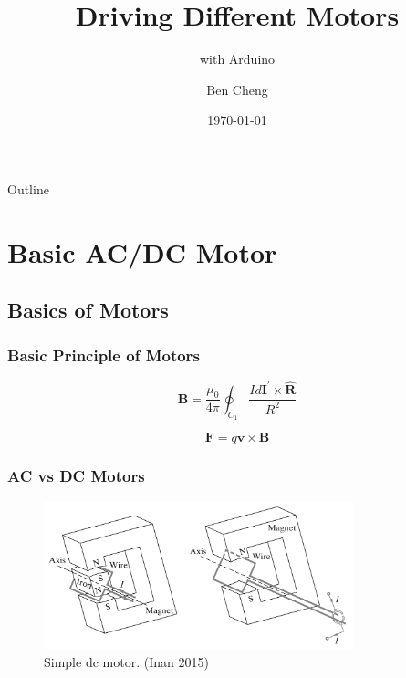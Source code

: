 \documentclass[compress, aspectratio=32]{beamer}
\title[Motors]{Driving Different Motors}
\subtitle{with Arduino}
\author{Ben Cheng}
\institute{RISD ID}
\date{\today}
\begin{document}
\frame{\titlepage}

\begin{frame}[allowframebreaks]{Outline}
    \tableofcontents
\end{frame}

\section{Basic AC/DC Motor}
\subsection{Basics of Motors}
\begin{frame}
    \frametitle{Basic Principle of Motors}
    \begin{theorem}
        \begin{equation*}
            \mathbf{B}=\frac{\mu_0}{4\pi}\oint_{C_1}\frac{I d \mathbf{I}^\prime \times \hat{\mathbf{R}}}{R^2}
        \end{equation*}
    \end{theorem}
    \begin{theorem}
        \begin{equation*}
            \mathbf{F}=q\mathbf{v}\times\mathbf{B}
        \end{equation*}
    \end{theorem}
\end{frame}

\begin{frame}
    \frametitle{AC vs DC Motors}
    \begin{figure}
        \centering
        \includegraphics[width=0.8\textwidth]{motor.png}
        \caption{Simple dc motor. (Inan 2015)}
    \end{figure}
\end{frame}
\end{document}
